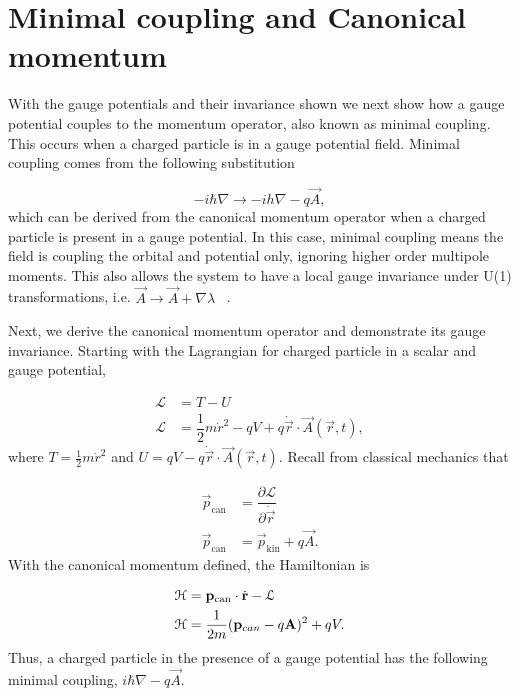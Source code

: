 \section{Minimal coupling and Canonical momentum}
With the gauge potentials and their invariance shown we next show how a gauge potential couples to the momentum operator, also known as minimal coupling.
This occurs when a charged particle is in a gauge potential field.
Minimal coupling comes from the following substitution

\begin{equation}
  -i\hbar\nabla \rightarrow -ih\nabla - q\vec{A},
\end{equation}
which can be derived from the canonical momentum operator when a charged particle is present in a gauge potential.
In this case, minimal coupling means the field is coupling the orbital and potential only, ignoring higher order multipole moments.
This also allows the system to have a local gauge invariance under U(1) transformations, i.e.
$\vec{A} \rightarrow \vec{A} + \nabla\lambda$  ~\cite{altlandCondensedMatterField2023}.

Next, we derive the canonical momentum operator and demonstrate its gauge invariance.
Starting with the Lagrangian for charged particle in a scalar and gauge potential,

\begin{align}
  \mathcal{L} &= T- U \nonumber \\
  \mathcal{L} &= \dfrac{1}{2} m \dot{r}^2 - qV + q \dot{\vec{r}} \cdot \vec{A}(\vec{r},t),
\end{align}
where $T = \tfrac{1}{2} m \dot{r}^2$ and $U = qV - q \dot{\vec{r}} \cdot \vec{A}(\vec{r},t)$.
Recall from classical mechanics that

\begin{align}
  \vec{p}_{\text{can}} &= \dfrac{\partial\mathcal{L}}{\partial \dot{\vec{r}}} \nonumber \\
  \vec{p}_{\text{can}} &= \vec{p}_{\text{kin}} + q \vec{A}.
  \label{eq:canonical-momentum}
\end{align}
With the canonical momentum defined, the Hamiltonian is

\begin{align}
  \mathcal{H} &= \mathbf{p}_{\text{can}} \cdot \dot{\mathbf{r}} - \mathcal{L} \nonumber \\
  \mathcal{H} &= \dfrac{1}{2m} (\mathbf{p}_{can} - q \mathbf{A})^2 + q V.
\end{align}
Thus, a charged particle in the presence of a gauge potential has the following minimal coupling,
$i\hbar\nabla - q\vec{A}$.


